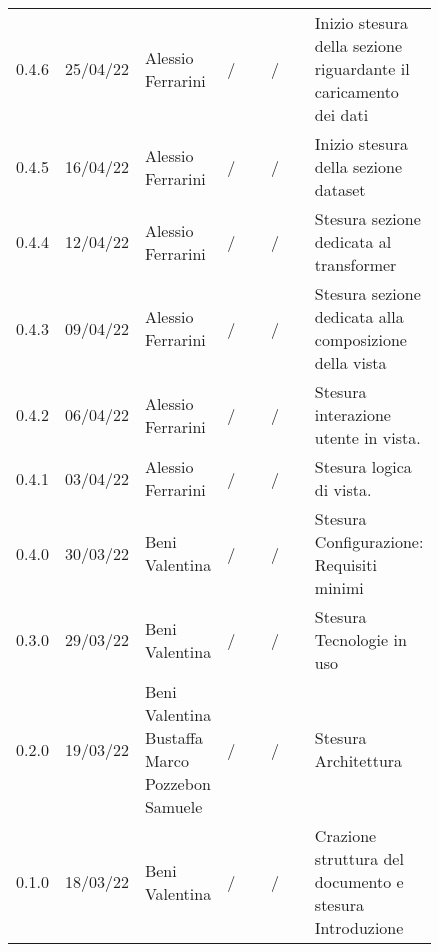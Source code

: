 {\begin{tabular}{p{0.10\linewidth}p{0.10\linewidth}p{0.15\linewidth}p{0.15\linewidth}p{0.15\linewidth}p{0.19\linewidth}}
  \\
	\rowcolor[RGB]{233, 245, 206}
	0.4.6 & 25/04/22 & Alessio Ferrarini & / & / & Inizio stesura della sezione
  riguardante il caricamento dei dati \\
	\rowcolor[RGB]{216, 235, 171}
	0.4.5 & 16/04/22 & Alessio Ferrarini & / & / & Inizio stesura della sezione
  dataset \\
	\rowcolor[RGB]{233, 245, 206}
	0.4.4 & 12/04/22 & Alessio Ferrarini & / & / & Stesura sezione dedicata al
  transformer \\
	\rowcolor[RGB]{216, 235, 171}
	0.4.3 & 09/04/22 & Alessio Ferrarini & / & / & Stesura sezione dedicata alla
  composizione della vista \\
	\rowcolor[RGB]{233, 245, 206}
	0.4.2 & 06/04/22 & Alessio Ferrarini & / & / & Stesura interazione utente in
  vista. \\
	\rowcolor[RGB]{216, 235, 171}
	0.4.1 & 03/04/22 & Alessio Ferrarini & / & / & Stesura logica di vista. \\
	\rowcolor[RGB]{233, 245, 206}
	0.4.0 & 30/03/22 & Beni Valentina & / & / & Stesura Configurazione: Requisiti minimi\\
	\rowcolor[RGB]{216, 235, 171}
	0.3.0 & 29/03/22 & Beni Valentina & / & / & Stesura Tecnologie in uso\\
	\rowcolor[RGB]{233, 245, 206}
	0.2.0 & 19/03/22 & Beni Valentina Bustaffa Marco Pozzebon Samuele & / & / & Stesura Architettura\\
	\rowcolor[RGB]{216, 235, 171}
	0.1.0 & 18/03/22 & Beni Valentina & / & / & Crazione struttura del documento e stesura Introduzione\\
\end{tabular}
}
